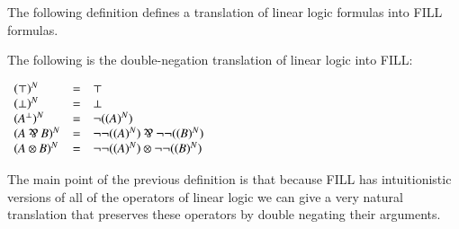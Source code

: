 \documentclass{elsarticle}
\begin{document}
The following definition defines a translation of linear logic formulas into FILL formulas.
\begin{definition}
  \label{def:ll-to-fill}
  The following is the double-negation translation of linear logic
  into FILL:
  \begin{center}
  \begin{math}
    \begin{array}{lll}
       (  \top  )^N  & = &  \top \\
       (  \perp  )^N  & = &  \perp \\
       (  \FILLnt{A} ^{\perp}  )^N  & = &  \lnot  \FILLsym{(}   ( \FILLnt{A} )^N   \FILLsym{)} \\
       (  \FILLnt{A}  \parr  \FILLnt{B}  )^N  & = &    \lnot    \lnot  \FILLsym{(}   ( \FILLnt{A} )^N   \FILLsym{)}      \parr   \lnot    \lnot  \FILLsym{(}   ( \FILLnt{B} )^N   \FILLsym{)}    \\
       (  \FILLnt{A}  \otimes  \FILLnt{B}  )^N  & = &    \lnot    \lnot  \FILLsym{(}   ( \FILLnt{A} )^N   \FILLsym{)}      \otimes   \lnot    \lnot  \FILLsym{(}   ( \FILLnt{B} )^N   \FILLsym{)}    \\
    \end{array}
  \end{math}
\end{center}
\end{definition}
\noindent
The main point of the previous definition is that because FILL has
intuitionistic versions of all of the operators of linear logic we can
give a very natural translation that preserves these operators by
double negating their arguments.  
\end{document}
